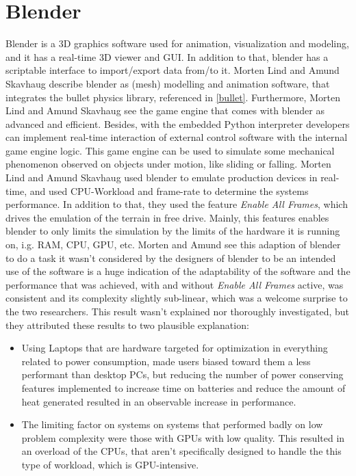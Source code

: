 \documentclass[
	12pt, 
	a4paper, 
]{article}
\begin{document}
	\section{Blender}\label{blender}
	Blender is a 3D graphics software used for animation, visualization and modeling, and it has a real-time 3D viewer and GUI. In addition to that, blender has a scriptable interface to import/export data from/to it\cite{kent20153d}. Morten Lind and Amund Skavhaug describe blender as (mesh) modelling and animation software, that integrates the bullet physics library, referenced in \ref{bullet}. Furthermore, Morten Lind and Amund Skavhaug see the game engine that comes with blender as advanced and efficient. Besides, with the embedded Python interpreter developers can implement real-time interaction of external control software with the internal game engine logic. This game engine can be used to simulate some mechanical phenomenon observed on objects under motion, like sliding or falling.\cite{lind2012using}\newline
	Morten Lind and Amund Skavhaug used blender to emulate production devices in real-time, and used CPU-Workload and frame-rate to determine the systems performance. In addition to that, they used the feature \textit{Enable All Frames}, which drives the emulation of the terrain in free drive. Mainly, this features enables blender to only limits the simulation by the limits of the hardware it is running on, i.g. RAM, CPU, GPU, etc\cite{lind2012using}. Morten and Amund see this adaption of blender to do a task it wasn't considered by the designers of blender to be an intended use of the software\cite{lind2012using} is a huge indication of the adaptability of the software and the performance that was achieved, with and without \textit{Enable All Frames} active, was consistent and its complexity slightly sub-linear\cite{lind2012using}, which was a welcome surprise to the two researchers. This result wasn't explained nor thoroughly investigated, but they attributed these results to two plausible explanation\cite{lind2012using}:
	\begin{itemize}
		\item Using Laptops that are hardware targeted for optimization in everything related to power consumption, made users biased toward them a less performant than desktop PCs, but reducing the number of power conserving features implemented to increase time on batteries and reduce the amount of heat generated resulted in an observable increase in performance\cite{lind2012using}.
		\item The limiting factor on systems on systems that performed badly on low problem complexity were those with GPUs with low quality. This resulted in an overload of the CPUs, that aren't specifically designed to handle the this type of workload, which is GPU-intensive\cite{lind2012using}.
	\end{itemize}
\end{document}
